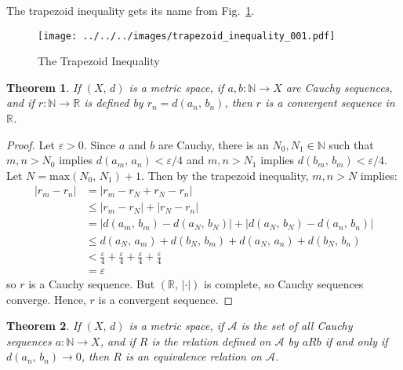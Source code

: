\documentclass{article}
\theoremstyle{plain}
\newtheorem{theorem}{Theorem}
\theoremstyle{normal}
\begin{document}
    The trapezoid inequality gets its name from
    Fig.~\ref{fig:trapezoid_inequality_001}.
    \begin{figure}
        \centering
        \texttt{[image: ../../../images/trapezoid\_inequality\_001.pdf]}
        \caption{The Trapezoid Inequality}
        \label{fig:trapezoid_inequality_001}
    \end{figure}
    \begin{theorem}
        If $(X,\,d)$ is a metric space, if $a,b:\mathbb{N}\rightarrow{X}$ are
        Cauchy sequences, and if $r:\mathbb{N}\rightarrow\mathbb{R}$ is defined
        by $r_{n}=d(a_{n},\,b_{n})$, then $r$ is a convergent sequence in
        $\mathbb{R}$.
    \end{theorem}
    \begin{proof}
        Let $\varepsilon>0$. Since $a$ and $b$ are
        Cauchy, there is an $N_{0},N_{1}\in\mathbb{N}$ such that
        $m,n>N_{0}$ implies $d(a_{m},\,a_{n})<\varepsilon/4$ and
        $m,n>N_{1}$ implies $d(b_{m},\,b_{m})<\varepsilon/4$. Let
        $N=\textrm{max}(N_{0},\,N_{1})+1$. Then by the trapezoid inequality,
        $m,n>N$ implies:
        \begin{align}
            |r_{m}-r_{n}|
            &=|r_{m}-r_{N}+r_{N}-r_{n}|\\
            &\leq|r_{m}-r_{N}|+|r_{N}-r_{n}|\\
            &=|d(a_{m},\,b_{m})-d(a_{N},\,b_{N})|
                +|d(a_{N},\,b_{N})-d(a_{n},\,b_{n})|\\
            &\leq{d}(a_{N},\,a_{m})+d(b_{N},\,b_{m})
                +d(a_{N},\,a_{n})+d(b_{N},\,b_{n})\\
            &<\frac{\varepsilon}{4}+\frac{\varepsilon}{4}
                +\frac{\varepsilon}{4}+\frac{\varepsilon}{4}\\
            &=\varepsilon
        \end{align}
        so $r$ is a Cauchy sequence. But $(\mathbb{R},\,|\cdot|)$ is complete,
        so Cauchy sequences converge. Hence, $r$ is a convergent sequence.
    \end{proof}
    \begin{theorem}
        If $(X,\,d)$ is a metric space, if $\mathcal{A}$ is the set of all
        Cauchy sequences $a:\mathbb{N}\rightarrow{X}$, and if
        $R$ is the relation defined on $\mathcal{A}$ by
        $aRb$ if and only if $d(a_{n},\,b_{n})\rightarrow{0}$, then
        $R$ is an equivalence relation on $\mathcal{A}$.
    \end{theorem}
\end{document}
